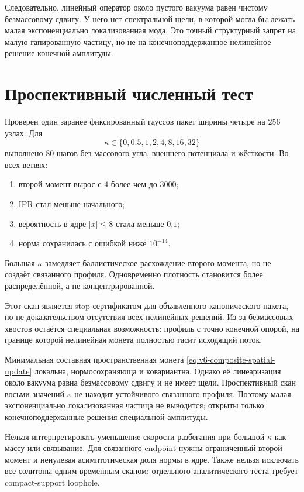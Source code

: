 Следовательно, линейный оператор около пустого вакуума равен чистому
безмассовому сдвигу. У него нет спектральной щели, в которой могла бы
лежать малая экспоненциально локализованная мода. Это точный структурный
запрет на малую гапированную частицу, но не на конечноподдержанное
нелинейное решение конечной амплитуды.

\section{Проспективный численный тест}

Проверен один заранее фиксированный гауссов пакет ширины четыре на $256$
узлах. Для
\begin{equation}
 \kappa\in\{0,0.5,1,2,4,8,16,32\}
\end{equation}
выполнено $80$ шагов без массового угла, внешнего потенциала и жёсткости.
Во всех ветвях:
\begin{enumerate}
 \item второй момент вырос с $4$ более чем до $3000$;
 \item IPR стал меньше начального;
 \item вероятность в ядре $|x|\le8$ стала меньше $0.1$;
 \item норма сохранилась с ошибкой ниже $10^{-14}$.
\end{enumerate}
Большая $\kappa$ замедляет баллистическое расхождение второго момента, но
не создаёт связанного профиля. Одновременно плотность становится более
распределённой, а не концентрированной.

Этот скан является stop-сертификатом для объявленного канонического пакета,
но не доказательством отсутствия всех нелинейных решений. Из-за безмассовых
хвостов остаётся специальная возможность: профиль с точно конечной опорой,
на границе которой нелинейная монета полностью гасит исходящий поток.

\begin{theorem}
Минимальная составная пространственная монета
\eqref{eq:v6-composite-spatial-update} локальна, нормосохраняюща и
ковариантна. Однако её линеаризация около вакуума равна безмассовому
сдвигу и не имеет щели. Проспективный скан восьми значений $\kappa$ не
находит устойчивого связанного профиля. Поэтому малая экспоненциально
локализованная частица не выводится; открыты только конечноподдержанные
решения специальной амплитуды.
\end{theorem}

\begin{nogocriterion}
Нельзя интерпретировать уменьшение скорости разбегания при большой
$\kappa$ как массу или связывание. Для связанного endpoint нужны
ограниченный второй момент и ненулевая асимптотическая доля нормы в ядре.
Также нельзя исключать все солитоны одним временным сканом: отдельного
аналитического теста требует compact-support loophole.
\end{nogocriterion}

